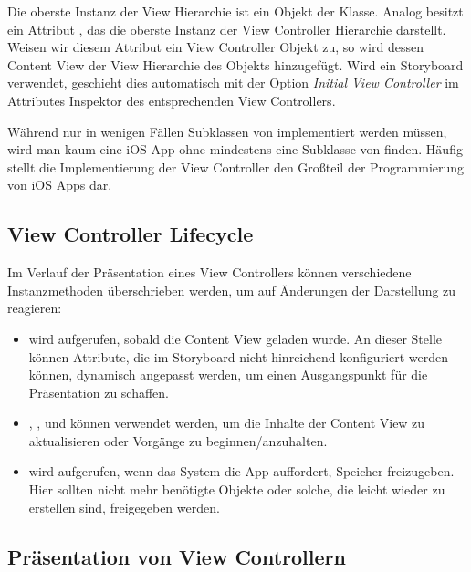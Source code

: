 \documentclass[parskip=half, final]{scrreprt}
\begin{document}
Die oberste Instanz der View Hierarchie ist ein Objekt der  Klasse. Analog besitzt  ein Attribut , das die oberste Instanz der View Controller Hierarchie darstellt. Weisen wir diesem Attribut ein View Controller Objekt zu, so wird dessen Content View der View Hierarchie des  Objekts hinzugefügt. Wird ein Storyboard verwendet, geschieht dies automatisch mit der Option \emph{Initial View Controller} im Attributes Inspektor des entsprechenden View Controllers.

Während nur in wenigen Fällen Subklassen von  implementiert werden müssen, wird man kaum eine iOS App ohne mindestens eine Subklasse von  finden. Häufig stellt die Implementierung der View Controller den Großteil der Programmierung von iOS Apps dar.

\subsection{View Controller Lifecycle}

Im Verlauf der Präsentation eines View Controllers können verschiedene Instanzmethoden überschrieben werden, um auf Änderungen der Darstellung zu reagieren:
\begin{itemize}
\item {} wird aufgerufen, sobald die Content View geladen wurde. An dieser Stelle können Attribute, die im Storyboard nicht hinreichend konfiguriert werden können, dynamisch angepasst werden, um einen Ausgangspunkt für die Präsentation zu schaffen.
\item {}, ,  und  können verwendet werden, um die Inhalte der Content View zu aktualisieren oder Vorgänge zu beginnen/anzuhalten.
\item {} wird aufgerufen, wenn das System die App auffordert, Speicher freizugeben. Hier sollten nicht mehr benötigte Objekte oder solche, die leicht wieder zu erstellen sind, freigegeben werden.
\end{itemize}

\subsection{Präsentation von View Controllern}
\end{document}
